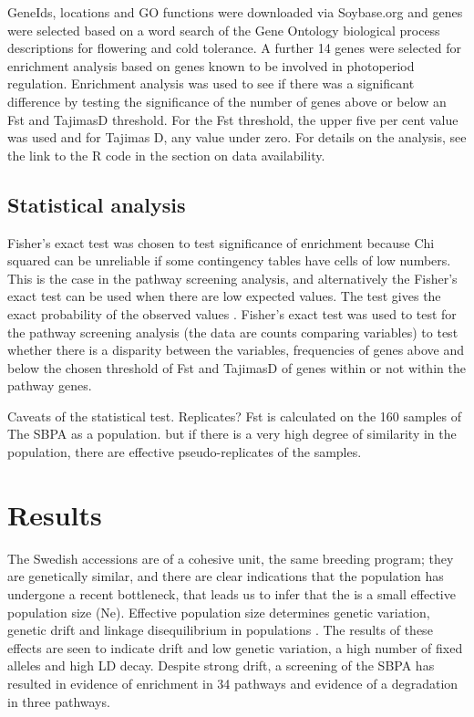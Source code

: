 \documentclass[9pt, twocolumn,twoside]{gsajnl}
\begin{document}
GeneIds, locations and GO functions were downloaded via Soybase.org and genes were selected based on a word search of the Gene Ontology biological process descriptions for flowering and cold tolerance. A further 14 genes were selected for enrichment analysis based on genes known to be involved in photoperiod regulation.   
Enrichment analysis was used to see if there was a significant difference by testing the significance of the number of genes above or below an Fst and TajimasD threshold. For the Fst threshold, the upper five per cent value was used and for Tajimas D, any value under zero. For details on the analysis, see the link to the R code in the section on data availability.  \label{sec:data:availability}  

\subsection{Statistical analysis}

Fisher's exact test was chosen to test significance of enrichment because Chi squared can be unreliable if some contingency tables have cells of low numbers. This is the case in the pathway screening analysis, and alternatively the Fisher's exact test can be used when there are low expected values. The test gives the exact probability of the observed values \cite{quicke21}.  Fisher's exact test was used to test for the pathway screening analysis (the data are counts comparing variables) to test whether there is a disparity between the variables, frequencies of genes above and below the chosen threshold of Fst and TajimasD of genes within or not within the pathway genes. 

Caveats of the statistical test. 
Replicates? Fst is calculated on the 160 samples of The SBPA as a population. but if there is a very high degree of similarity in the population, there are effective pseudo-replicates of the samples. 

\section{Results}

The Swedish accessions are of a cohesive unit, the same breeding program; they are genetically similar, and there are clear indications that the population has undergone a recent bottleneck, that leads us to infer that the is a small effective population size (Ne). Effective population size determines genetic variation, genetic drift and linkage disequilibrium in populations \cite{tenesa07}. The results of these effects are seen to indicate drift and low genetic variation, a high number of fixed alleles and high LD decay. 
Despite strong drift, a screening of the SBPA has resulted in evidence of enrichment in 34 pathways and evidence of a degradation in three pathways.
\end{document}
